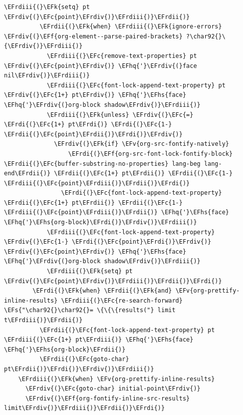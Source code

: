 \documentclass{scrartcl}
\newcommand{\EFk}[1]{\textcolor{EFk}{#1}} %
\newcommand{\EFs}[1]{\textcolor{EFs}{#1}} %
\newcommand{\EFc}[1]{\textcolor{EFc}{#1}} %
\newcommand{\EFv}[1]{\textcolor{EFv}{#1}} %
\newcommand{\EFf}[1]{\textcolor{EFf}{#1}} %
\newcommand{\EFhq}[1]{#1} %
\newcommand{\EFhs}[1]{#1} %
\newcommand{\EFrdi}[1]{#1} %
\newcommand{\EFrdii}[1]{#1} %
\newcommand{\EFrdiii}[1]{#1} %
\newcommand{\EFrdiv}[1]{#1} %
\begin{document}
\begin{Code}
\begin{Verbatim}[]
            \EFrdiii{(}\EFk{setq} pt \EFrdiv{(}\EFc{point}\EFrdiv{)}\EFrdiii{)}\EFrdii{)}
          \EFrdii{(}\EFk{when} \EFrdiii{(}\EFk{ignore-errors} \EFrdiv{(}\EFf{org-element--parse-paired-brackets} ?\char92{}\{\EFrdiv{)}\EFrdiii{)}
            \EFrdiii{(}\EFc{remove-text-properties} pt \EFrdiv{(}\EFc{point}\EFrdiv{)} \EFhq{'}\EFrdiv{(}face nil\EFrdiv{)}\EFrdiii{)}
            \EFrdiii{(}\EFc{font-lock-append-text-property} pt \EFrdiv{(}\EFc{1+} pt\EFrdiv{)} \EFhq{'}\EFhs{face} \EFhq{'}\EFrdiv{(}org-block shadow\EFrdiv{)}\EFrdiii{)}
            \EFrdiii{(}\EFk{unless} \EFrdiv{(}\EFc{=} \EFrdi{(}\EFc{1+} pt\EFrdi{)} \EFrdi{(}\EFc{1-} \EFrdii{(}\EFc{point}\EFrdii{)}\EFrdi{)}\EFrdiv{)}
              \EFrdiv{(}\EFk{if} \EFv{org-src-fontify-natively}
                  \EFrdi{(}\EFf{org-src-font-lock-fontify-block} \EFrdii{(}\EFc{buffer-substring-no-properties} lang-beg lang-end\EFrdii{)} \EFrdii{(}\EFc{1+} pt\EFrdii{)} \EFrdii{(}\EFc{1-} \EFrdiii{(}\EFc{point}\EFrdiii{)}\EFrdii{)}\EFrdi{)}
                \EFrdi{(}\EFc{font-lock-append-text-property} \EFrdii{(}\EFc{1+} pt\EFrdii{)} \EFrdii{(}\EFc{1-} \EFrdiii{(}\EFc{point}\EFrdiii{)}\EFrdii{)} \EFhq{'}\EFhs{face} \EFhq{'}\EFhs{org-block}\EFrdi{)}\EFrdiv{)}\EFrdiii{)}
            \EFrdiii{(}\EFc{font-lock-append-text-property} \EFrdiv{(}\EFc{1-} \EFrdi{(}\EFc{point}\EFrdi{)}\EFrdiv{)} \EFrdiv{(}\EFc{point}\EFrdiv{)} \EFhq{'}\EFhs{face} \EFhq{'}\EFrdiv{(}org-block shadow\EFrdiv{)}\EFrdiii{)}
            \EFrdiii{(}\EFk{setq} pt \EFrdiv{(}\EFc{point}\EFrdiv{)}\EFrdiii{)}\EFrdii{)}\EFrdi{)}
        \EFrdi{(}\EFk{when} \EFrdii{(}\EFk{and} \EFv{org-prettify-inline-results} \EFrdiii{(}\EFc{re-search-forward} \EFs{"\char92{}\char92{}= \{\{\{results("} limit t\EFrdiii{)}\EFrdii{)}
          \EFrdii{(}\EFc{font-lock-append-text-property} pt \EFrdiii{(}\EFc{1+} pt\EFrdiii{)} \EFhq{'}\EFhs{face} \EFhq{'}\EFhs{org-block}\EFrdii{)}
          \EFrdii{(}\EFc{goto-char} pt\EFrdii{)}\EFrdi{)}\EFrdiv{)}\EFrdiii{)}
    \EFrdiii{(}\EFk{when} \EFv{org-prettify-inline-results}
      \EFrdiv{(}\EFc{goto-char} initial-point\EFrdiv{)}
      \EFrdiv{(}\EFf{org-fontify-inline-src-results} limit\EFrdiv{)}\EFrdiii{)}\EFrdii{)}\EFrdi{)}


\end{Verbatim}
\end{Code}
\end{document}
